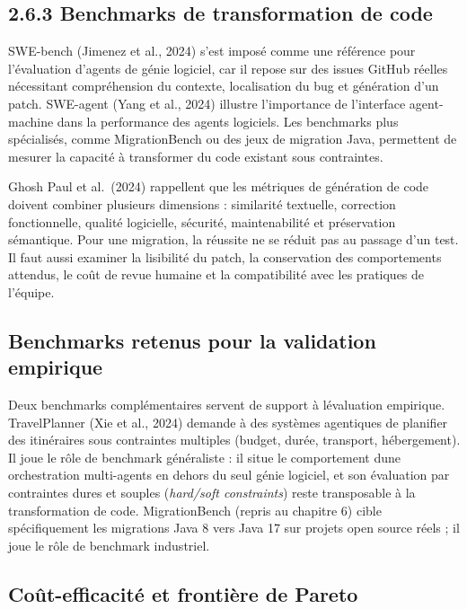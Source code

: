 \subsection{2.6.3 Benchmarks de transformation de code}\label{benchmarks-de-transformation-de-code}

SWE-bench (Jimenez et al., 2024) s'est imposé comme une référence pour l'évaluation d'agents de génie logiciel, car il repose sur des issues GitHub réelles nécessitant compréhension du contexte, localisation du bug et génération d'un patch. SWE-agent (Yang et al., 2024) illustre l'importance de l'interface agent-machine dans la performance des agents logiciels. Les benchmarks plus spécialisés, comme MigrationBench ou des jeux de migration Java, permettent de mesurer la capacité à transformer du code existant sous contraintes.

Ghosh Paul et al.~(2024) rappellent que les métriques de génération de code doivent combiner plusieurs dimensions : similarité textuelle, correction fonctionnelle, qualité logicielle, sécurité, maintenabilité et préservation sémantique. Pour une migration, la réussite ne se réduit pas au passage d'un test. Il faut aussi examiner la lisibilité du patch, la conservation des comportements attendus, le coût de revue humaine et la compatibilité avec les pratiques de l'équipe.


\subsection{Benchmarks retenus pour la validation empirique}

Deux benchmarks complémentaires servent de support à
l\textquotesingle évaluation empirique. TravelPlanner (Xie et al.,
2024) demande à des systèmes agentiques de planifier des itinéraires
sous contraintes multiples (budget, durée, transport, hébergement). Il
joue le rôle de benchmark généraliste : il situe le comportement
d\textquotesingle une orchestration multi-agents en dehors du seul
génie logiciel, et son évaluation par contraintes dures et souples
(\emph{hard/soft constraints}) reste transposable à la transformation
de code. MigrationBench (repris au chapitre 6) cible spécifiquement les
migrations Java 8 vers Java 17 sur projets open source réels ; il joue
le rôle de benchmark industriel.

\subsection{Co\^ut-efficacit\'e et fronti\`ere de Pareto}

